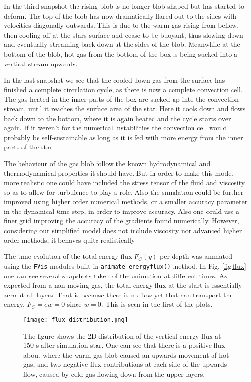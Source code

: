 \documentclass{emulateapj}
\begin{document}
	In the third snapshot the rising blob is no longer blob-shaped but has started to deform. The top of the blob has now dramatically flared out to the sides with velocities diagonally outwards. This is due to the warm gas rising from bellow, then cooling off at the stars surface and cease to be buoyant, thus slowing down and eventually streaming back down at the sides of the blob. Meanwhile at the bottom of the blob, hot gas from the bottom of the box is being sucked into a vertical stream upwards.
	
	In the last snapshot we see that the cooled-down gas from the surface has finished a complete circulation cycle, as there is now a complete convection cell. The gas heated in the inner parts of the box are sucked up into the convection stream, until it reaches the surface area of the star. Here it cools down and flows back down to the bottom, where it is again heated and the cycle starts over again. If it weren't for the numerical instabilities the convection cell would probably be self-sustainable as long as it is fed with more energy from the inner parts of the star. 
	
	The behaviour of the gas blob follow the known hydrodynamical and thermodynamical properties it should have. But in order to make this model more realistic one could have included the stress tensor of the fluid and viscosity so as to allow for turbulence to play a role. Also the simulation could be further improved using higher order numerical methods, or a smaller accuracy parameter in the dynamical time step, in order to improve accuracy. Also one could use a finer grid improving the accuracy of the gradients found numerically. However, considering our simplified model does not include viscosity nor advanced higher order methods, it behaves quite realistically. 
	
	The time evolution of the total energy flux $F_C(y)$ per depth was animated using the \texttt{FVis}-modules built in \texttt{animate\_energyflux()}-method. In Fig. \ref{fig:flux} one can see several snapshots taken of the animation at different times. As expected from a non-moving gas, the total energy flux at the start is essentially zero at all layers. That is because there is no flow yet that can transport the energy, $F_C = e w = 0$ since $w = 0$. This is seen in the first of the plots.
	
	\begin{figure*}
		\texttt{[image: flux\_distribution.png]}
		\caption{The figure shows the 2D distribution of the vertical energy flux at 150 s after simulation star. One can see that there is a positive flux about where the warm gas blob caused an upwards movement of hot gas, and two negative flux contributions at each side of the upwards flow, caused by cold gas flowing down from the upper layers.}
		\label{fig:fluxdistribution}
	\end{figure*}
	
\end{document}
